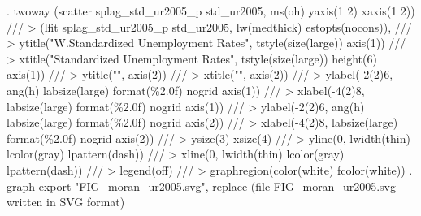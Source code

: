 . twoway (scatter splag_std_ur2005_p std_ur2005, ms(oh) yaxis(1 2) xaxis(1 2)) ///
>         (lfit splag_std_ur2005_p std_ur2005, lw(medthick) estopts(nocons)), ///
>         ytitle("W.Standardized Unemployment Rates", tstyle(size(large)) axis(1)) ///
>         xtitle("Standardized Unemployment Rates", tstyle(size(large)) height(6) axis(1)) ///
>         ytitle("", axis(2)) ///
>         xtitle("", axis(2)) ///
>         ylabel(-2(2)6, ang(h) labsize(large) format(\%2.0f) nogrid axis(1)) ///
>         xlabel(-4(2)8, labsize(large) format(\%2.0f) nogrid axis(1)) ///
>         ylabel(-2(2)6, ang(h) labsize(large) format(\%2.0f) nogrid axis(2)) ///
>         xlabel(-4(2)8, labsize(large) format(\%2.0f) nogrid axis(2)) ///
>         ysize(3) xsize(4) ///
>         yline(0, lwidth(thin) lcolor(gray) lpattern(dash)) ///
>         xline(0, lwidth(thin) lcolor(gray) lpattern(dash)) ///
>         legend(off) ///
>         graphregion(color(white) fcolor(white))
{\smallskip}
. graph export "FIG_moran_ur2005.svg", replace
(file FIG_moran_ur2005.svg written in SVG format)
